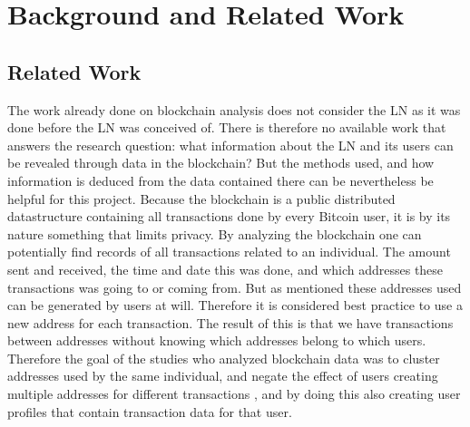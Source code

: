 \chapter{Background and Related Work}
\label{chap:related}

\section{Related Work}

The work already done on blockchain analysis does not consider the LN as it was done before the LN was conceived of. There is therefore no available work that answers the research question: what information about the LN and its users can be revealed through data in the blockchain?
But the methods used, and how information is deduced from the data contained there can be nevertheless be helpful for this project.
Because the blockchain is a public distributed datastructure containing all transactions done by every Bitcoin user, it is by its nature something that limits privacy. By analyzing the blockchain one can potentially find records of all transactions related to an individual. The amount sent and received, the time and date this was done, and which addresses these transactions was going to or coming from. But as mentioned these addresses used can be generated by users at will. Therefore it is considered best practice to use a new address for each transaction. The result of this is that we have transactions between addresses without knowing which addresses belong to which users. Therefore the goal of the studies who analyzed blockchain data was to cluster addresses used by the same individual, and negate the effect of users creating multiple addresses for different transactions \cite{herrera2015research}, and by doing this also creating user profiles that contain transaction data for that user.

